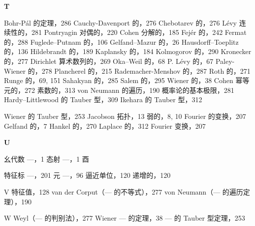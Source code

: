 \textbf{T}

Bohr-Pál 的定理，286 Cauchy-Davenport 的，276 Chebotarev 的，276 Lévy 连续性的，281 Pontryagin 对偶的，220 Cohen 分解的，185 Fejér 的，242 Fermat 的，288 Fuglede--Putnam 的，106 Gelfand--Mazur 的，26 Hausdorff--Toeplitz 的，136 Hildebrandt 的，189 Kaplansky 的，184 Kolmogorov 的，290 Kronecker 的，277 Dirichlet 算术数列的，269 Oka--Weil 的，68 P. Lévy 的，67 Paley-Wiener 的，278 Plancherel 的，215 Rademacher-Menshov 的，287 Roth 的，271 Runge 的，69, 151 Sahakyan 的，285 Salem 的，295 Wiener 的，38 Cohen 幂等元的，272 素数的，313 von Neumann 的遍历，190 概率论的基本极限，281 Hardy--Littlewood 的 Tauber 型，309 Ikehara 的 Tauber 型，312

Wiener 的 Tauber 型，253 Jacobson 拓扑，13 弱的，8, 10 Fourier 的变换，207 Gelfand 的，7 Hankel 的，270 Laplace 的，312 Fourier 变换，207

\textbf{U}

幺代数 ---，1 态射 ---，1 酉

特征标 ---，201 元 ---，96 逼近单位，120 递增的，120

V 特征值，128 van der Corput（--- 的不等式），277 von Neumann（--- 的遍历定理），190

W Weyl（--- 的判别法），277 Wiener --- 的定理，38 --- 的 Tauber 型定理，253
